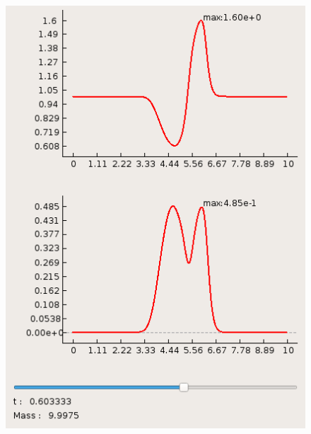 \documentclass[a4paper, 11pt]{article}
\begin{document}
\begin{figure}[H]
\begin{minipage}[h] {0.49\linewidth}
		\includegraphics[width=1\linewidth]{p2/p2_t=0,6.png}
	\end{minipage}


\end{figure}
\end{document}
